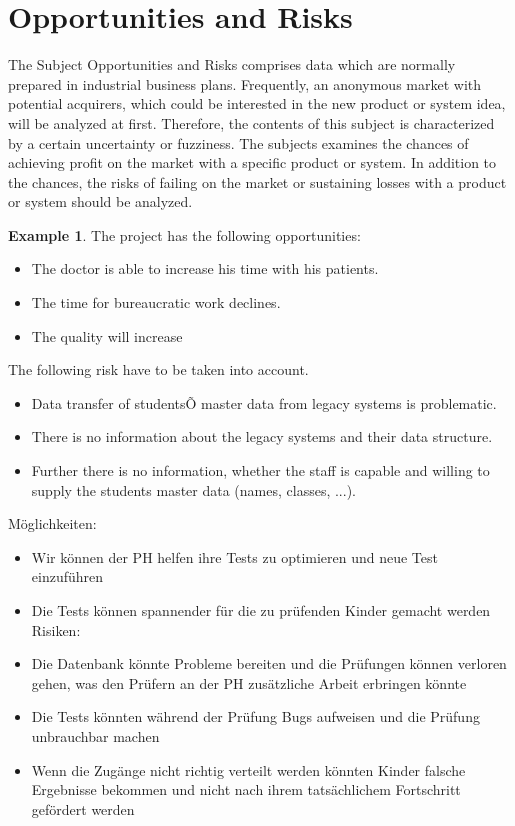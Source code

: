 \documentclass[12pt]{article}
\theoremstyle{definition}
\newtheorem{example}{Example}
\newenvironment{explanation}{%
   \setlength{\parindent}{0pt}
   \itshape
   \color{blue}
}{}
\begin{document}
\pagebreak
\section{Opportunities and Risks}
\begin{explanation}
The Subject Opportunities and Risks comprises data which are normally prepared in industrial business plans. Frequently, an anonymous market with potential acquirers, which could be interested in the new product or system idea, will be analyzed at first. Therefore, the contents of this subject is characterized by a certain uncertainty or fuzziness. The subjects examines the chances of achieving profit on the market with a specific product or system. In addition to the chances, the risks of failing on the market or sustaining losses with a product or system should be analyzed.
\end{explanation}

\begin{example}
The project has the following opportunities:
\begin{itemize}
\item The doctor is able to increase his time with his patients.
\item The time for bureaucratic work declines.
\item The quality will increase
\end{itemize}

The following risk have to be taken into account.
\begin{itemize}
\item Data transfer of studentsÕ master data from legacy systems is problematic.
\item There is no information about the legacy systems and their data structure.
\item Further there is no information, whether the staff is capable and willing to supply the students master data (names, classes, ...).
\end{itemize}
\end{example}
Möglichkeiten:
\begin{itemize}
    \item Wir können der PH helfen ihre Tests zu optimieren und neue Test einzuführen
    \item Die Tests können spannender für die zu prüfenden Kinder gemacht werden
    Risiken:
    \item Die Datenbank könnte Probleme bereiten und die Prüfungen können verloren gehen, was den Prüfern an der PH zusätzliche Arbeit erbringen könnte
    \item Die Tests könnten während der Prüfung Bugs aufweisen und die Prüfung unbrauchbar machen
    \item Wenn die Zugänge nicht richtig verteilt werden könnten Kinder falsche Ergebnisse bekommen und nicht nach ihrem tatsächlichem Fortschritt gefördert werden
\end{itemize}
\end{document}
